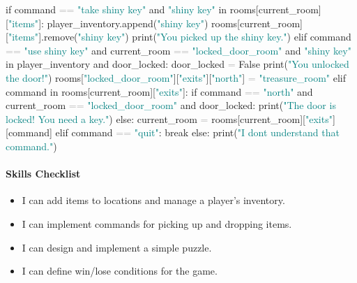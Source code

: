 \documentclass[
  justified,
  openright,
]{tufte-book}
\let\subsubsection\paragraph
\let\paragraph\paragraph
\newcommand{\BuiltInTok}[1]{#1}
\newcommand{\ControlFlowTok}[1]{\textcolor{BrandBlue}{#1}}
\newcommand{\KeywordTok}[1]{\textcolor{BrandBlue}{#1}}
\newcommand{\NormalTok}[1]{#1}
\newcommand{\OperatorTok}[1]{\textcolor{DarkGray}{#1}}
\newcommand{\StringTok}[1]{\textcolor{Teal}{#1}}
\newcommand{\VariableTok}[1]{#1}
\newenvironment{Shaded}{%
  \begin{snugshade}
}{%
  \end{snugshade}
}
\let\subsubsection\paragraph
\let\paragraph\paragraph
\providecommand{\tightlist}{%
  \setlength{\itemsep}{0pt}\setlength{\parskip}{0pt}}
\begin{document}
\begin{Shaded}
\begin{Highlighting}[]
    \ControlFlowTok{if}\NormalTok{ command }\OperatorTok{==} \StringTok{"take shiny key"} \KeywordTok{and} \StringTok{"shiny key"} \KeywordTok{in}\NormalTok{ rooms[current\_room][}\StringTok{"items"}\NormalTok{]:}
\NormalTok{        player\_inventory.append(}\StringTok{"shiny key"}\NormalTok{)}
\NormalTok{        rooms[current\_room][}\StringTok{"items"}\NormalTok{].remove(}\StringTok{"shiny key"}\NormalTok{)}
        \BuiltInTok{print}\NormalTok{(}\StringTok{"You picked up the shiny key."}\NormalTok{)}
    \ControlFlowTok{elif}\NormalTok{ command }\OperatorTok{==} \StringTok{"use shiny key"} \KeywordTok{and}\NormalTok{ current\_room }\OperatorTok{==} \StringTok{"locked\_door\_room"} \KeywordTok{and} \StringTok{"shiny key"} \KeywordTok{in}\NormalTok{ player\_inventory }\KeywordTok{and}\NormalTok{ door\_locked:}
\NormalTok{        door\_locked }\OperatorTok{=} \VariableTok{False}
        \BuiltInTok{print}\NormalTok{(}\StringTok{"You unlocked the door!"}\NormalTok{)}
\NormalTok{        rooms[}\StringTok{"locked\_door\_room"}\NormalTok{][}\StringTok{"exits"}\NormalTok{][}\StringTok{"north"}\NormalTok{] }\OperatorTok{=} \StringTok{"treasure\_room"}
    \ControlFlowTok{elif}\NormalTok{ command }\KeywordTok{in}\NormalTok{ rooms[current\_room][}\StringTok{"exits"}\NormalTok{]:}
        \ControlFlowTok{if}\NormalTok{ command }\OperatorTok{==} \StringTok{"north"} \KeywordTok{and}\NormalTok{ current\_room }\OperatorTok{==} \StringTok{"locked\_door\_room"} \KeywordTok{and}\NormalTok{ door\_locked:}
            \BuiltInTok{print}\NormalTok{(}\StringTok{"The door is locked! You need a key."}\NormalTok{)}
        \ControlFlowTok{else}\NormalTok{:}
\NormalTok{            current\_room }\OperatorTok{=}\NormalTok{ rooms[current\_room][}\StringTok{"exits"}\NormalTok{][command]}
    \ControlFlowTok{elif}\NormalTok{ command }\OperatorTok{==} \StringTok{"quit"}\NormalTok{:}
        \ControlFlowTok{break}
    \ControlFlowTok{else}\NormalTok{:}
        \BuiltInTok{print}\NormalTok{(}\StringTok{"I don\textquotesingle{}t understand that command."}\NormalTok{)}
\end{Highlighting}
\end{Shaded}

\subsubsection{Skills Checklist}\label{skills-checklist-49}

\begin{itemize}
\tightlist
\item[$\square$]
  I can add items to locations and manage a player's inventory.
\item[$\square$]
  I can implement commands for picking up and dropping items.
\item[$\square$]
  I can design and implement a simple puzzle.
\item[$\square$]
  I can define win/lose conditions for the game.
\end{itemize}
\end{document}
